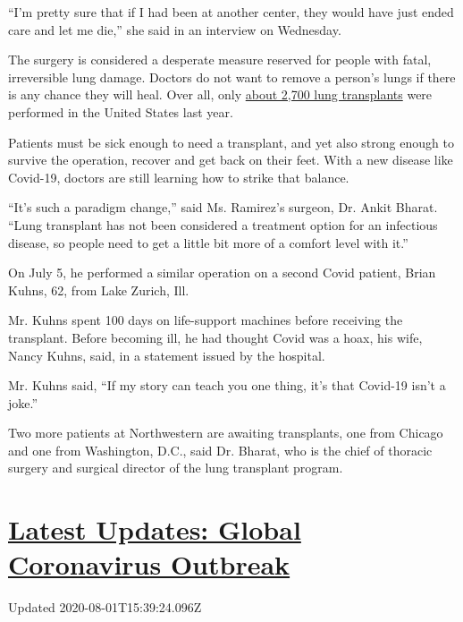 ``I'm pretty sure that if I had been at another center, they would have
just ended care and let me die,'' she said in an interview on Wednesday.

The surgery is considered a desperate measure reserved for people with
fatal, irreversible lung damage. Doctors do not want to remove a
person's lungs if there is any chance they will heal. Over all, only
\href{https://unos.org/data/transplant-trends/}{about 2,700 lung
transplants} were performed in the United States last year.

Patients must be sick enough to need a transplant, and yet also strong
enough to survive the operation, recover and get back on their feet.
With a new disease like Covid-19, doctors are still learning how to
strike that balance.

``It's such a paradigm change,'' said Ms. Ramirez's surgeon, Dr. Ankit
Bharat. ``Lung transplant has not been considered a treatment option for
an infectious disease, so people need to get a little bit more of a
comfort level with it.''

On July 5, he performed a similar operation on a second Covid patient,
Brian Kuhns, 62, from Lake Zurich, Ill.

Mr. Kuhns spent 100 days on life-support machines before receiving the
transplant. Before becoming ill, he had thought Covid was a hoax, his
wife, Nancy Kuhns, said, in a statement issued by the hospital.

Mr. Kuhns said, ``If my story can teach you one thing, it's that
Covid-19 isn't a joke.''

Two more patients at Northwestern are awaiting transplants, one from
Chicago and one from Washington, D.C., said Dr. Bharat, who is the chief
of thoracic surgery and surgical director of the lung transplant
program.

\hypertarget{latest-updates-global-coronavirus-outbreak}{%
\section{\texorpdfstring{\href{https://www.nytimes.com/2020/08/01/world/coronavirus-covid-19.html?action=click\&pgtype=Article\&state=default\&region=MAIN_CONTENT_1\&context=storylines_live_updates}{Latest
Updates: Global Coronavirus
Outbreak}}{Latest Updates: Global Coronavirus Outbreak}}\label{latest-updates-global-coronavirus-outbreak}}

Updated 2020-08-01T15:39:24.096Z

